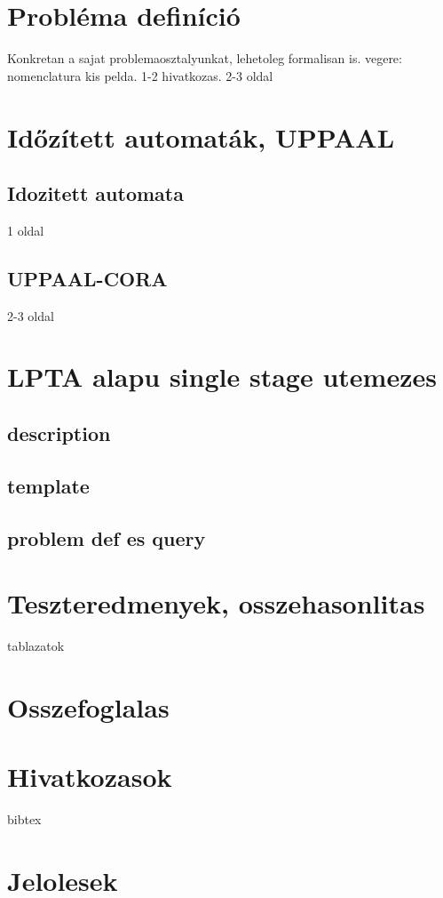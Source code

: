 \documentclass {report}
\begin{document}
\chapter{Probléma definíció}
Konkretan a sajat problemaosztalyunkat, lehetoleg formalisan is.
vegere: nomenclatura
kis pelda.
1-2 hivatkozas.
2-3 oldal

\chapter{Időzített automaták, UPPAAL}
\section{Idozitett automata} 1 oldal
\section{UPPAAL-CORA} 2-3 oldal

\chapter{LPTA alapu single stage utemezes}
    \section{description}
    \section{template}
    \section{problem def es query}

\chapter{Teszteredmenyek, osszehasonlitas}
tablazatok

\chapter{Osszefoglalas}

\chapter*{Hivatkozasok}
bibtex

\appendix

\chapter{Jelolesek}
\end{document}
